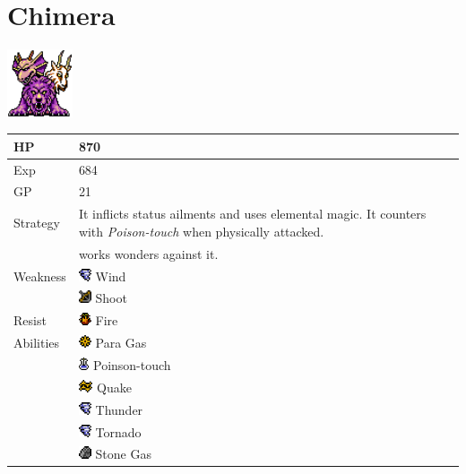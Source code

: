 \section{Chimera}
\label{monster:chimera}

\includegraphics[height=2cm,keepaspectratio]{./resources/monster/chimera}

\begin{longtable}{ l p{9cm} }
	HP
	& 870
\\ \hline
	Exp
	& 684
\\ \hline
	GP
	& 21
\\ \hline
	Strategy
	& It inflicts status ailments and uses elemental magic. It counters with \textit{Poison-touch} when physically attacked. \\
	& \nameref{spell:aero} works wonders against it.
\\ \hline
	Weakness
	& \includegraphics[height=1em,keepaspectratio]{./resources/effects/wind} Wind \\
	& \includegraphics[height=1em,keepaspectratio]{./resources/effects/shoot} Shoot
\\ \hline
	Resist
	& \includegraphics[height=1em,keepaspectratio]{./resources/effects/fire} Fire
\\ \hline
	Abilities
	& \includegraphics[height=1em,keepaspectratio]{./resources/effects/paralyze} Para Gas \\
	& \includegraphics[height=1em,keepaspectratio]{./resources/effects/poison} Poinson-touch \\
	& \includegraphics[height=1em,keepaspectratio]{./resources/effects/earth} Quake \\
	& \includegraphics[height=1em,keepaspectratio]{./resources/effects/wind} Thunder \\
	& \includegraphics[height=1em,keepaspectratio]{./resources/effects/wind} Tornado \\
	& \includegraphics[height=1em,keepaspectratio]{./resources/effects/petrify} Stone Gas
\end{longtable}
